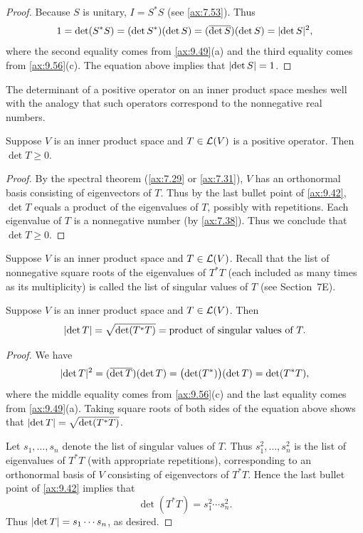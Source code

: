 \begin{proof}
Because $S$ is unitary, $I=S^*S$ (see \ref{ax:7.53}). Thus
\[ 1 = \operatorname{det}(S^*S) = (\operatorname{det} S^*)(\operatorname{det} S) = (\overline{\operatorname{det} S})(\operatorname{det} S)
   = \lvert \operatorname{det} S \rvert^2, \]
where the second equality comes from \ref{ax:9.49}(a) and the third equality
comes from \ref{ax:9.56}(c). The equation above implies that
$\lvert \operatorname{det} S \rvert=1$.
\end{proof}

The determinant of a positive operator on an inner product space meshes well
with the analogy that such operators correspond to the nonnegative real
numbers.

\begin{result}\label{ax:9.59}
Suppose $V$ is an inner product space and $T\in\mathcal{L}(V)$ is a positive
operator. Then $\det T\ge0$.
\end{result}

\begin{proof}
By the spectral theorem (\ref{ax:7.29} or \ref{ax:7.31}), $V$ has an
orthonormal basis consisting of eigenvectors of $T$. Thus by the last bullet
point of \ref{ax:9.42}, $\det T$ equals a product of the eigenvalues of $T$,
possibly with repetitions. Each eigenvalue of $T$ is a nonnegative number (by
\ref{ax:7.38}). Thus we conclude that $\det T\ge0$.
\end{proof}

Suppose $V$ is an inner product space and $T\in\mathcal{L}(V)$. Recall that the list
of nonnegative square roots of the eigenvalues of $T^*T$ (each included as many
times as its multiplicity) is called the list of singular values of $T$ (see
Section~7E).

\begin{result}[$\abs{\det T}={}$product of singular values of $T$]\label{ax:9.60}
Suppose $V$ is an inner product space and $T\in\mathcal{L}(V)$. Then
\[ \lvert \operatorname{det} T \rvert = \sqrt{\operatorname{det}(T^*T)}
   = \text{product of singular values of } T. \]
\end{result}

\begin{proof}
We have
\[ \lvert \operatorname{det} T \rvert^2 = (\overline{\operatorname{det} T})(\operatorname{det} T)
   = \bigl(\operatorname{det}(T^*)\bigr)(\operatorname{det} T) = \operatorname{det}(T^*T), \]
where the middle equality comes from \ref{ax:9.56}(c) and the last equality
comes from \ref{ax:9.49}(a). Taking square roots of both sides of the equation
above shows that $\lvert \operatorname{det} T \rvert=\sqrt{\operatorname{det}(T^*T)}$.

Let $s_1,\dots,s_n$ denote the list of singular values of $T$. Thus
$s_1^2,\dots,s_n^2$ is the list of eigenvalues of $T^*T$ (with appropriate
repetitions), corresponding to an orthonormal basis of $V$ consisting of
eigenvectors of $T^*T$. Hence the last bullet point of \ref{ax:9.42} implies
that
\[ \det(T^*T) = s_1^2\cdots s_n^2. \]
Thus $\lvert \operatorname{det} T \rvert=s_1\cdots s_n$, as desired.
\end{proof}

